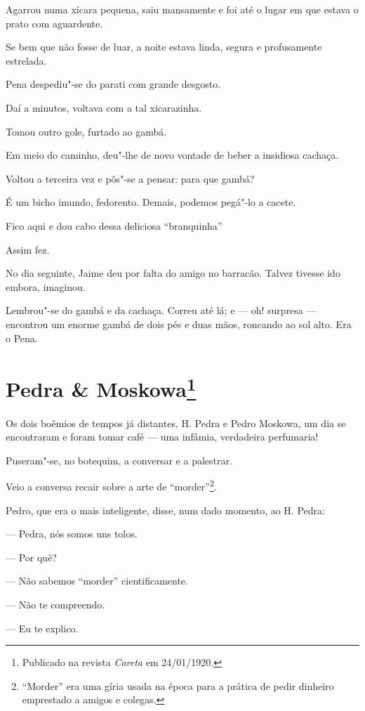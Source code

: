 Agarrou numa xícara pequena, saiu mansamente e foi até o lugar em que
estava o prato com aguardente.

Se bem que não fosse de luar, a noite estava linda, segura e
profusamente estrelada.

Pena despediu"-se do parati com grande desgosto.

Daí a minutos, voltava com a tal xicarazinha.

Tomou outro gole, furtado ao gambá.

Em meio do caminho, deu"-lhe de novo vontade de beber a insidiosa
cachaça.

Voltou a terceira vez e pôs"-se a pensar: para que gambá?

É um bicho imundo, fedorento. Demais, podemos pegá"-lo a cacete.

Fico aqui e dou cabo dessa deliciosa ``branquinha''

Assim fez.

No dia seguinte, Jaime deu por falta do amigo no barracão. Talvez
tivesse ido embora, imaginou.

Lembrou"-se do gambá e da cachaça. Correu até lá; e --- oh! surpresa ---
encontrou um enorme gambá de dois pés e duas mãos, roncando ao sol alto.
Era o Pena.



\chapter[Pedra \& Moskowa]{Pedra \& Moskowa\footnote[*]{Publicado na revista \emph{Careta} em 24/01/1920.}}

Os dois boêmios de tempos já distantes, H. Pedra e Pedro Moskowa, um dia
se encontraram e foram tomar café --- uma infâmia, verdadeira perfumaria!

Puseram"-se, no botequim, a conversar e a palestrar.

Veio a conversa recair sobre a arte de ``morder''\footnote{``Morder''
  era uma gíria usada na época para a prática de pedir dinheiro
  emprestado a amigos e colegas.}.

Pedro, que era o mais inteligente, disse, num dado momento, ao H. Pedra:

--- Pedra, nós somos uns tolos.

--- Por quê?

--- Não sabemos ``morder'' cientificamente.

--- Não te compreendo.

--- Eu te explico.

